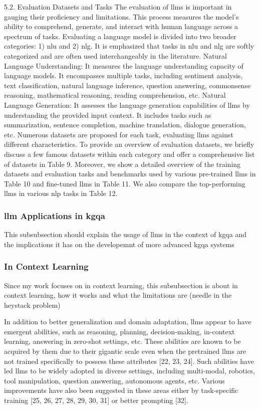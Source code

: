 5.2. Evaluation Datasets and Tasks The evaluation of \glspl{llm} is important in gauging their proficiency and limitations. This process measures the model’s ability to comprehend, generate, and interact with human language across a spectrum of tasks. Evaluating a language model  is divided into two broader categories: 1) \gls{nlu} and 2) \gls{nlg}. It is emphasized that tasks in \gls{nlu} and \gls{nlg} are softly categorized and are often used interchangeably in the literature. Natural Language Understanding: It measures the language understanding capacity of language models. It encompasses multiple tasks, including sentiment analysis, text classification, natural language inference, question answering, commonsense reasoning, mathematical reasoning, reading comprehension, etc. Natural Language Generation: It assesses the language generation capabilities of \glspl{llm} by understanding the provided input context. It includes tasks such as summarization, sentence completion, machine translation, dialogue generation, etc. Numerous datasets are proposed for each task, evaluating \glspl{llm} against different characteristics. To provide an overview of evaluation datasets, we briefly discuss a few famous datasets within each category and offer a comprehensive list of datasets in Table 9. Moreover, we show a detailed overview of the training datasets and evaluation tasks and benchmarks used by various pre-trained \glspl{llm} in Table 10 and fine-tuned \glspl{llm} in Table 11. We also compare the top-performing \glspl{llm} in various \gls{nlp} tasks in Table 12.\cite{mielkeWordsCharactersBrief2021}

\subsubsection{\gls{llm} Applications in \gls{kgqa}}
This subsubsection should explain the usage of \glspl{llm} in the context of \gls{kgqa} and the implications it has on the developemnt of more advanced \gls{kgqa} systems

\subsubsection{In Context Learning}
Since my work focuses on in context learning, this subsubsection is about in context learning, how it works and what the limitations are (needle in the heystack problem)

In addition to better generalization and domain adaptation, \glspl{llm} appear to have emergent abilities, such as reasoning, planning, decision-making, in-context learning, answering in zero-shot settings, etc. These abilities are known to be acquired by them due to their gigantic scale even when the pretrained \glspl{llm} are not trained specifically to possess these attributes [22, 23, 24]. Such abilities have led \glspl{llm} to be widely adopted in diverse settings, including multi-modal, robotics, tool manipulation, question answering, autonomous agents, etc. Various improvements have also been suggested in these areas either by task-specific training [25, 26, 27, 28, 29, 30, 31] or better prompting [32].\cite{naveedComprehensiveOverviewLarge2024}

